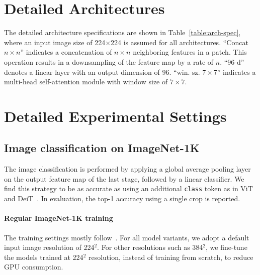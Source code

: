\documentclass[10pt,twocolumn,letterpaper]{article}
\begin{document}
\renewcommand{\thesection}{A\arabic{section}}

\section{Detailed Architectures}

The detailed architecture specifications are shown in Table~\ref{table:arch-spec}, where an input image size of 224$\times$224 is assumed for all architectures.
``Concat $n\times n$'' indicates a concatenation of $n\times n$ neighboring features in a patch. This operation results in a downsampling of the feature map by a rate of $n$. ``96-d'' denotes a linear layer with an output dimension of 96. ``win. sz. $7\times7$'' indicates a multi-head self-attention module with window size of $7\times 7$.


\section{Detailed Experimental Settings}

\subsection{Image classification on ImageNet-1K}

The image classification is performed by applying a global average pooling layer on the output feature map of the last stage, followed by a linear classifier. We find this strategy to be as accurate as using an additional \texttt{class} token as in ViT~\cite{dosovitskiy2020vit} and DeiT~\cite{touvron2020deit}. In evaluation, the top-1 accuracy using a single crop is reported.

\paragraph{Regular ImageNet-1K training} The training settings mostly follow~\cite{touvron2020deit}. For all model variants, we adopt a default input image resolution of 224$^2$. For other resolutions such as 384$^2$, we fine-tune the models trained at 224$^2$ resolution, instead of training from scratch, to reduce GPU consumption.
\end{document}
